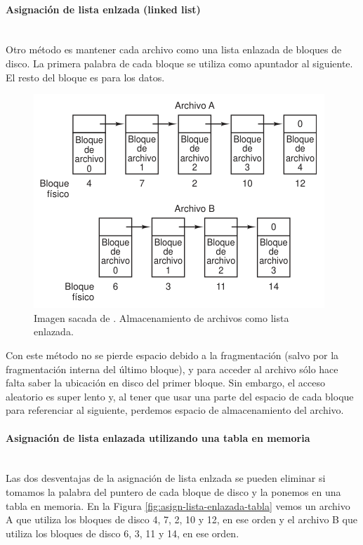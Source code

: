 \documentclass[12pt]{article}
\begin{document}
  \paragraph{Asignación de lista enlzada (linked list)}\mbox{}\\
  Otro método es mantener cada archivo como una lista enlazada de bloques de disco. La primera palabra de cada bloque se utiliza como apuntador al siguiente. El resto del bloque es para los datos.

  \begin{figure}[H]
    \centering
    \includegraphics[width=0.7\linewidth]{imagenes/asign-lista-enlazada.png}
    \caption{Imagen sacada de \parencite{tanenbaum}. Almacenamiento de archivos como lista enlazada.}
    \label{fig:aign-lista-enlazada}
  \end{figure}

  Con este método no se pierde espacio debido a la fragmentación (salvo por la fragmentación interna del último bloque), y para acceder al archivo sólo hace falta saber la ubicación en disco del primer bloque. Sin embargo, el acceso aleatorio es super lento y, al tener que usar una parte del espacio de cada bloque para referenciar al siguiente, perdemos espacio de almacenamiento del archivo.

  \paragraph{Asignación de lista enlazada utilizando una tabla en memoria}\mbox{}\\
  Las dos desventajas de la asignación de lista enlzada se pueden eliminar si tomamos la palabra del puntero de cada bloque de disco y la ponemos en una tabla en memoria. En la Figura \ref{fig:asign-lista-enlazada-tabla} vemos un archivo A que utiliza los bloques de disco 4, 7, 2, 10 y 12, en ese orden y el archivo B que utiliza los bloques de disco 6, 3, 11 y 14, en ese orden.
\end{document}
